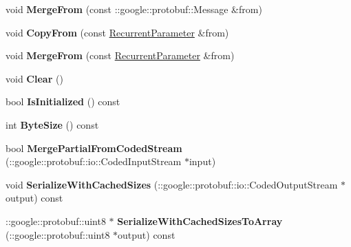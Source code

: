 \begin{DoxyCompactItemize}
\mbox{\label{classcaffe_1_1_recurrent_parameter_aec8837cb599c1fe34c8b465d7de036f9}} 
void {\bfseries Merge\+From} (const \+::google\+::protobuf\+::\+Message \&from)
\item 
\mbox{\label{classcaffe_1_1_recurrent_parameter_a52dcb4ecb5e1e9ab58709289f9f37b30}} 
void {\bfseries Copy\+From} (const \mbox{\hyperlink{classcaffe_1_1_recurrent_parameter}{Recurrent\+Parameter}} \&from)
\item 
\mbox{\label{classcaffe_1_1_recurrent_parameter_ad13ab1f1dd596a1fda9fbbfb545aac1b}} 
void {\bfseries Merge\+From} (const \mbox{\hyperlink{classcaffe_1_1_recurrent_parameter}{Recurrent\+Parameter}} \&from)
\item 
\mbox{\label{classcaffe_1_1_recurrent_parameter_aaac9ab62ce9db47d1b8f8bb8f81596d5}} 
void {\bfseries Clear} ()
\item 
\mbox{\label{classcaffe_1_1_recurrent_parameter_a32532caca583424274dc990ef4644ff2}} 
bool {\bfseries Is\+Initialized} () const
\item 
\mbox{\label{classcaffe_1_1_recurrent_parameter_af333245e69857b2e24a76c31f9bbfc07}} 
int {\bfseries Byte\+Size} () const
\item 
\mbox{\label{classcaffe_1_1_recurrent_parameter_a7713a055ca62165c3ee50c6c145cbe49}} 
bool {\bfseries Merge\+Partial\+From\+Coded\+Stream} (\+::google\+::protobuf\+::io\+::\+Coded\+Input\+Stream $\ast$input)
\item 
\mbox{\label{classcaffe_1_1_recurrent_parameter_ad05e2f20dadd6d66325e8588818e578e}} 
void {\bfseries Serialize\+With\+Cached\+Sizes} (\+::google\+::protobuf\+::io\+::\+Coded\+Output\+Stream $\ast$output) const
\item 
\mbox{\label{classcaffe_1_1_recurrent_parameter_acf9a386ddb6214fa26016749e4c6b73b}} 
\+::google\+::protobuf\+::uint8 $\ast$ {\bfseries Serialize\+With\+Cached\+Sizes\+To\+Array} (\+::google\+::protobuf\+::uint8 $\ast$output) const

\end{DoxyCompactItemize}
